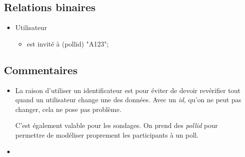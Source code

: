 \documentclass{article}
\begin{document}
\subsection{Relations binaires}

\begin{itemize}
     \item Utilisateur
     \begin{itemize}
          \item est invité à (pollid) "A123";
     \end{itemize}
\end{itemize}

\subsection{Commentaires}

    \begin{itemize}
        \item La raison d'utiliser un identificateur est pour éviter de devoir revérifier tout quand un utilisateur change une des données. Avec un \textit{id}, qu'on ne peut pas changer, cela ne pose pas problème.

        C'est également valable pour les sondages. On prend des \textit{pollid} pour permettre de modéliser proprement les participants à un poll.
        \item
    \end{itemize}
\end{document}
